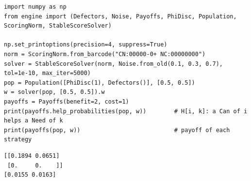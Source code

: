 \begin{lstlisting}[style=code]
import numpy as np
from engine import (Defectors, Noise, Payoffs, PhiDisc, Population, ScoringNorm, StableScoreSolver)

np.set_printoptions(precision=4, suppress=True)
norm = ScoringNorm.from_barcode("CN:00000-0+ NC:00000000")
solver = StableScoreSolver(norm, Noise.from_old(0.1, 0.3, 0.7), tol=1e-10, max_iter=5000)
pop = Population([PhiDisc(1), Defectors()], [0.5, 0.5])
w = solver(pop, [0.5, 0.5]).w
payoffs = Payoffs(benefit=2, cost=1)
print(payoffs.help_probabilities(pop, w))        # H[i, k]: a Can of i helps a Need of k
print(payoffs(pop, w))                           # payoff of each strategy
\end{lstlisting}
\begin{lstlisting}[style=output]
[[0.1894 0.0651]
 [0.     0.    ]]
[0.0155 0.0163]
\end{lstlisting}
